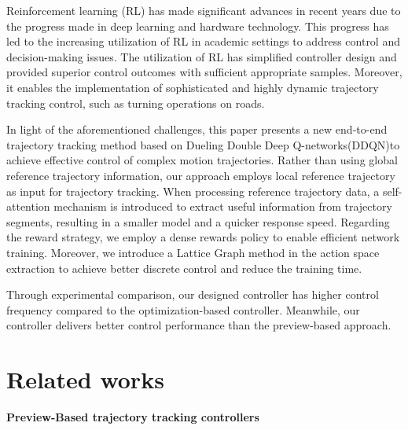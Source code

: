 \documentclass[sn-mathphys]{sn-jnl}%
\theoremstyle{thmstyleone}%
\theoremstyle{thmstyletwo}%
\theoremstyle{thmstylethree}%
\begin{document}
Reinforcement learning (RL) has made significant advances in recent years due to the progress made in deep learning and hardware technology. This progress has led to the increasing utilization of RL in academic settings to address control and decision-making issues\cite{chenInterpretableEndtoEndUrban2022,huangEndtoEndAutonomousDriving2019}. The utilization of RL has simplified controller design and provided superior control outcomes with sufficient appropriate samples. Moreover, it enables the implementation of sophisticated and highly dynamic trajectory tracking control, such as turning operations on roads\cite{hilleliDeepReinforcementLearning2018}.

In light of the aforementioned challenges, this paper presents a new end-to-end trajectory tracking method based on Dueling Double Deep Q-networks(DDQN)to achieve effective control of complex motion trajectories. Rather than using global reference trajectory information, our approach employs local reference trajectory as input for trajectory tracking. When processing reference trajectory data, a self-attention mechanism is introduced to extract useful information from trajectory segments, resulting in a smaller model and a quicker response speed. Regarding the reward strategy, we employ a dense rewards policy to enable efficient network training. Moreover, we introduce a Lattice Graph method in the action space extraction to achieve better discrete control and reduce the training time\cite{pivtoraikoDifferentiallyConstrainedMobile2009}. 


Through experimental comparison, our designed controller has higher control frequency compared to the optimization-based controller. Meanwhile, our controller delivers better control performance than the preview-based approach.

\section{Related works}\label{sec2}
\textbf{Preview-Based trajectory tracking controllers}
\end{document}
